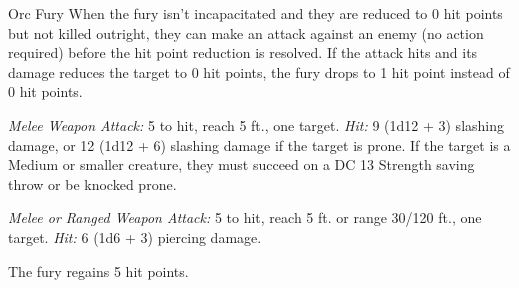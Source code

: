 \documentclass[10pt,a4paper,twoside,bg=print,twocolumn,openany,nodeprecatedcode]{dndbook}
\begin{document}
\begin{DndMonster}[float=t]{Orc Fury}
\DndMonsterBasics[
armor-class = {13 (studded leather armor)},
hit-points = {\DndDice{3d8 + 9}},
speed = {35 ft.}
]
\DndMonsterAbilityScores[
 str = 17,
 dex = 12,
 con = 16,
 int = 9,
 wis = 11,
 cha = 12
]
\DndMonsterDetails[
saving-throws = {Str +5},
skills = {Athletics +5},
senses = {darkvision 60 ft., passive perception 10},
languages = {Common, Orc},
challenge = 1/2,
]
When the fury isn't incapacitated and they are reduced to 0 hit points but not killed outright, they can make an attack against an enemy (no action required) before the hit point reduction is resolved. If the attack hits and its damage reduces the target to 0 hit points, the fury drops to 1 hit point instead of 0 hit points.

\textsl{Melee Weapon Attack:} 5 to hit, reach 5 ft., one target. \textsl{Hit:} 9 (1d12 + 3) slashing damage, or 12 (1d12 + 6) slashing damage if the target is prone. If the target is a Medium or smaller creature, they must succeed on a DC 13 Strength saving throw or be knocked prone.

\textsl{Melee or Ranged Weapon Attack:} 5 to hit, reach 5 ft. or range 30/120 ft., one target. \textsl{Hit:} 6 (1d6 + 3) piercing damage.

The fury regains 5 hit points.

\end{DndMonster}
\end{document}
